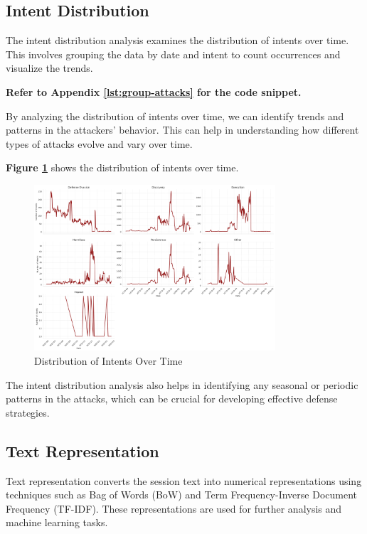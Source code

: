     \subsection{Intent Distribution}
            
        The intent distribution analysis examines the distribution of intents over time. This involves grouping the data by date and intent to count occurrences and visualize the trends.
            
        \textbf{Refer to Appendix \ref{lst:group-attacks} for the code snippet.}

        By analyzing the distribution of intents over time, we can identify trends and patterns in the attackers' behavior. This can help in understanding how different types of attacks evolve and vary over time.

        \textbf{Figure \ref{fig:intent-distribution}} shows the distribution of intents over time.

        \begin{figure}[h]
            \centering
            \includegraphics[width=0.8\textwidth]{../figures/plots/section1/intents_over_timestamps.png}
            \caption{Distribution of Intents Over Time}
            \label{fig:intent-distribution}
        \end{figure}

        The intent distribution analysis also helps in identifying any seasonal or periodic patterns in the attacks, which can be crucial for developing effective defense strategies.

    \subsection{Text Representation}
    
        Text representation converts the session text into numerical representations using techniques such as Bag of Words (BoW) and Term Frequency-Inverse Document Frequency (TF-IDF). These representations are used for further analysis and machine learning tasks.
        
